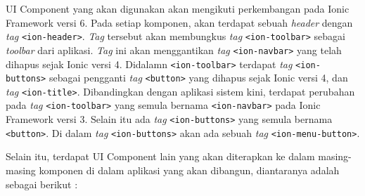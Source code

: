 UI Component yang akan digunakan akan mengikuti perkembangan pada Ionic Framework versi 6. Pada setiap komponen, akan terdapat sebuah \textit{header} dengan \textit{tag} \texttt{<ion-header>}. \textit{Tag} tersebut akan membungkus \textit{tag} \texttt{<ion-toolbar>} sebagai \textit{toolbar} dari aplikasi. \textit{Tag} ini akan menggantikan \textit{tag} \texttt{<ion-navbar>} yang telah dihapus sejak Ionic versi 4. Didalamn \texttt{<ion-toolbar>} terdapat \textit{tag} \texttt{<ion-buttons>} sebagai pengganti \textit{tag} \texttt{<button>} yang dihapus sejak Ionic versi 4, dan \textit{tag} \texttt{<ion-title>}. Dibandingkan dengan aplikasi sistem kini, terdapat perubahan pada \textit{tag} \texttt{<ion-toolbar>} yang semula bernama \texttt{<ion-navbar>} pada Ionic Framework versi 3. Selain itu ada \textit{tag} \texttt{<ion-buttons>} yang semula bernama \texttt{<button>}. Di dalam \textit{tag} \texttt{<ion-buttons>} akan ada sebuah \textit{tag} \texttt{<ion-menu-button>}.

Selain itu, terdapat UI Component lain yang akan diterapkan ke dalam masing-masing komponen di dalam aplikasi yang akan dibangun, diantaranya adalah sebagai berikut :

